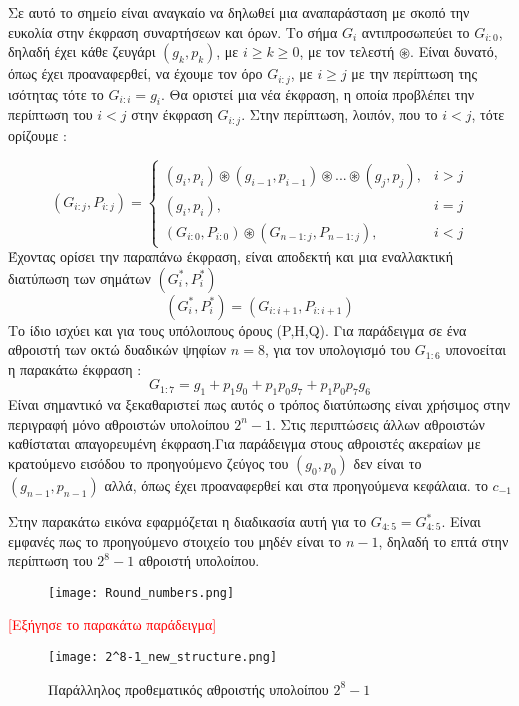 Σε αυτό το σημείο είναι αναγκαίο να δηλωθεί μια αναπαράσταση με σκοπό την ευκολία στην
έκφραση συναρτήσεων και όρων. Το σήμα $G_{i}$ αντιπροσωπεύει το $G_{i:0}$, δηλαδή
έχει κάθε ζευγάρι $(g_k,p_k)$, με $ i \geq k \geq 0 $, με τον τελεστή $\circledast$.
Είναι δυνατό, όπως έχει προαναφερθεί, να έχουμε τον όρο $G_{i:j}$, με $ i \geq j$ με
την περίπτωση της ισότητας τότε το $G_{i:i} = g_i$. Θα οριστεί μια νέα έκφραση, η οποία 
προβλέπει την περίπτωση του $i < j$ στην έκφραση $G_{i:j}$. Στην περίπτωση, λοιπόν, που το
$i < j$, τότε ορίζουμε :

\begin{equation}
    (G_{i:j},P_{i:j}) =
    \begin{cases}
        (g_i,p_i)\circledast(g_{i-1},p_{i-1})\circledast...\circledast(g_j,p_j) ,& i > j \\
        (g_i,p_i) ,& i = j \\
        (G_{i:0},P_{i:0}) \circledast (G_{n-1:j},P_{n-1:j}) ,& i < j
    \end{cases}
\end{equation}
Έχοντας ορίσει την παραπάνω έκφραση, είναι αποδεκτή και μια εναλλακτική διατύπωση των σημάτων $(G^*_i,P^*_i)$
\begin{equation}
    (G^*_i,P^*_i) = (G_{i:i+1},P_{i:i+1})
\end{equation}
Το ίδιο ισχύει και για τους υπόλοιπους όρους (P,H,Q).
Για παράδειγμα σε ένα αθροιστή των οκτώ δυαδικών ψηφίων $n=8$, για τον υπολογισμό του 
$G_{1:6}$ υπονοείται η παρακάτω έκφραση :
\begin{equation*}
    G_{1:7} = g_1 + p_1g_0 + p_1p_0g_7 + p_1p_0p_7g_6
\end{equation*}
Είναι σημαντικό να ξεκαθαριστεί πως αυτός ο τρόπος διατύπωσης είναι χρήσιμος στην περιγραφή μόνο
αθροιστών υπολοίπου $2^n-1$. Στις περιπτώσεις άλλων αθροιστών καθίσταται απαγορευμένη έκφραση.Για παράδειγμα
στους αθροιστές ακεραίων με κρατούμενο εισόδου το προηγούμενο ζεύγος του $(g_0,p_0)$ δεν είναι το 
$(g_{n-1},p_{n-1})$ αλλά, όπως έχει προαναφερθεί και στα προηγούμενα κεφάλαια. το $c_{-1}$

Στην παρακάτω εικόνα εφαρμόζεται η διαδικασία αυτή για το $G_{4:5} = G^*_{4:5}$. Είναι εμφανές
πως το προηγούμενο στοιχείο του μηδέν είναι το $n-1$, δηλαδή το επτά στην περίπτωση του $2^8-1$
αθροιστή υπολοίπου. 
\begin{figure}[H]
\centering
\texttt{[image: Round\_numbers.png]}
\end{figure}
\textcolor{red}{[Εξήγησε το παρακάτω παράδειγμα]}
\begin{figure}[H]
\centering
\texttt{[image: 2^8-1\_new\_structure.png]}
\caption{Παράλληλος προθεματικός αθροιστής υπολοίπου $2^8-1$}
\label{fig:2^8-1_new_structure}
\end{figure}





